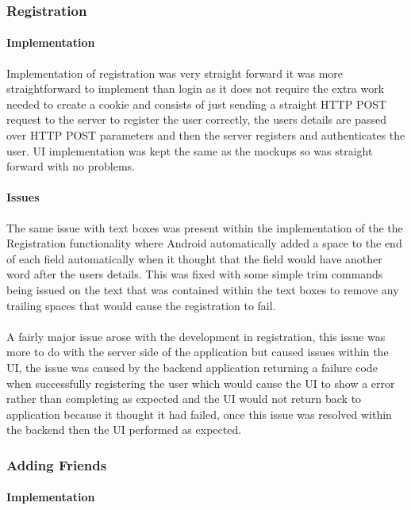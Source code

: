 \subsubsection*{Registration}

\paragraph*{Implementation}

Implementation of registration was very straight forward it was more straightforward to implement than login as it does not require the extra work needed to create a cookie and consists of just sending a straight HTTP POST request to the server to register the user correctly, the users details are passed over HTTP POST parameters and then the server registers and authenticates the user. UI implementation was kept the same as the mockups so was straight forward with no problems.

\paragraph*{Issues}

The same issue with text boxes was present within the implementation of the the Registration functionality where Android automatically added a space to the end of each field automatically when it thought that the field would have another word after the users details. This was fixed with some simple trim commands being issued on the text that was contained within the text boxes to remove any trailing spaces that would cause the registration to fail.\\
\\
A fairly major issue arose with the development in registration, this issue was more to do with the server side of the application but caused issues within the UI, the issue was caused by the backend application returning a failure code when successfully registering the user which would cause the UI to show a error rather than completing as expected and the UI would not return back to application because it thought it had failed, once this issue was resolved within the backend then the UI performed as expected.


\subsubsection*{Adding Friends}

\paragraph*{Implementation}

